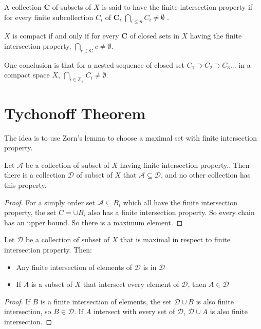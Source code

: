 \begin{definition}
    A collection $\mathbf{C}$ of subsets of $X$ is said to have the finite intersection property if for every finite subcollection $C_i$ of $\mathbf{C}$, $\bigcap_{i \leq n} C_i \neq \emptyset$ .
\end{definition}

\begin{theorem}\label{finite_intersection_in_compact_not_empty}
    $X$ is compact if and only if for every $\mathbf{C}$ of closed sets in $X$ having the finite intersection property, $\bigcap_{c \in \mathbf{C}} c \neq \emptyset$.
    
    One conclusion is that for a nested sequence of closed set $C_1 \supset C_2 \supset C_3 ...$ in a compact space $X$, $\bigcap_{i \in \mathbb{Z}_{+}} C_i \neq \emptyset$.
\end{theorem}


\section{Tychonoff Theorem}

The idea is to use Zorn's lemma to choose a maximal set with finite intersection property.

\begin{theorem}
    Let $\mathcal{A}$ be a collection of subset of $X$ having finite intersection property.. Then there is a collection $\mathcal{D}$ of subset of $X$ that $\mathcal{A} \subseteq \mathcal{D}$, and no other collection has this property.
\end{theorem}
\begin{proof}
    For a simply order set $\mathcal{A} \subseteq B_i$ which all have the finite intersection property, the set $C = \cup B_i$ also has a finite intersection property. So every chain has an upper bound. So there is a maximum element.
\end{proof}

\begin{theorem}
    Let $\mathcal{D}$ be a collection of subset of $X$ that is maximal in respect to finite intersection property. Then:
    \begin{itemize}
        \item Any finite intersection of elements of $\mathcal{D}$ is in $\mathcal{D}$
        \item If $A$ is a subset of $X$ that intersect every element of $\mathcal{D}$, then $A \in \mathcal{D}$
    \end{itemize}    
\end{theorem}
\begin{proof}
    If $B$ is a finite intersection of elements, the set $\mathcal{D} \cup B$ is also finite intersection, so $B \in \mathcal{D}$. If $A$ intersect with every set of $\mathcal{D}$, $\mathcal{D} \cup {A}$ is also finite intersection.
\end{proof}

